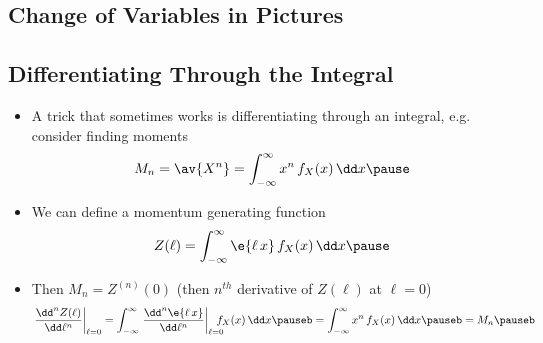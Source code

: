 \begin{slide}
  \section[-2]{Change of Variables in Pictures}

  \pause \pb{}
  \begin{center}
    \pause
  \end{center}
\end{slide}


\begin{slide}
\section[-1]{Differentiating Through the Integral}

\begin{PauseHighLight}
  \begin{itemize}
  \item A trick that sometimes works is differentiating through an
    integral, e.g.{} consider finding moments
    \begin{align*}
      M_n = \av{X^n} = \int_{-\infty}^\infty x^n \, f_X(x) \, \dd x\pause
    \end{align*}
  \item We can define a momentum generating function
    \begin{align*}
      Z(\ell) =  \int_{-\infty}^\infty \e{\ell \, x} \, f_X(x) \, \dd x\pause
    \end{align*}
  \item Then $M_n = Z^{(n)}(0)$\pause{} (then $n^{th}$ derivative of $Z(\ell)$
    at $\ell = 0$)\pauseb
    \begin{align*}
      \left. \frac{\dd^n Z(\ell)}{\dd \ell^n} \right|_{\ell = 0} = 
      \int_{-\infty}^\infty \left. \frac{\dd^n \e{\ell \, x}}{\dd
      \ell^n}  \right|_{\ell = 0}  \hspace{-1em} \, f_X(x) \, \dd x\pauseb
      =  \int_{-\infty}^\infty x^n \, f_X(x) \, \dd x\pauseb = M_n\pauseb
    \end{align*}
  \end{itemize}
\end{PauseHighLight}

\end{slide}


